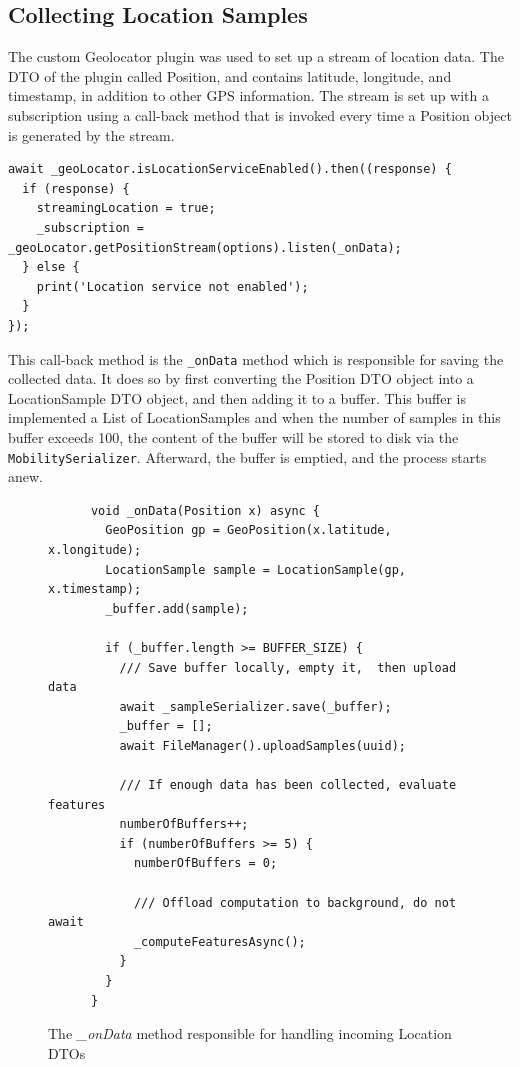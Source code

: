 \subsection{Collecting Location Samples}
The custom Geolocator plugin was used to set up a stream of location data. The DTO of the plugin called Position, and contains latitude, longitude, and timestamp, in addition to other GPS information. The stream is set up with a subscription using a call-back method that is invoked every time a Position object is generated by the stream. 

\begin{verbatim}
await _geoLocator.isLocationServiceEnabled().then((response) {
  if (response) {
    streamingLocation = true;
    _subscription = _geoLocator.getPositionStream(options).listen(_onData);
  } else {
    print('Location service not enabled');
  }
});
\end{verbatim}

This call-back method is the \verb|_onData| method which is responsible for saving the collected data. It does so by first converting the Position DTO object into a LocationSample DTO object, and then adding it to a buffer. This buffer is implemented a List of LocationSamples and when the number of samples in this buffer exceeds 100, the content of the buffer will be stored to disk via the \verb|MobilitySerializer|. Afterward, the buffer is emptied, and the process starts anew. 

\begin{figure}
    \centering
    \begin{verbatim}
      void _onData(Position x) async {
        GeoPosition gp = GeoPosition(x.latitude, x.longitude);
        LocationSample sample = LocationSample(gp, x.timestamp);
        _buffer.add(sample);

        if (_buffer.length >= BUFFER_SIZE) {
          /// Save buffer locally, empty it,  then upload data
          await _sampleSerializer.save(_buffer);
          _buffer = [];
          await FileManager().uploadSamples(uuid);
    
          /// If enough data has been collected, evaluate features
          numberOfBuffers++;
          if (numberOfBuffers >= 5) {
            numberOfBuffers = 0;
    
            /// Offload computation to background, do not await
            _computeFeaturesAsync();
          }
        }
      }
    \end{verbatim}
    \caption{The \textit{\_onData} method responsible for handling incoming Location DTOs}
    \label{fig:ondata-method}
\end{figure}



